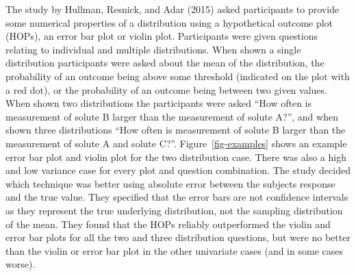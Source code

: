 \documentclass[
  letterpaper,
  DIV=11,
  numbers=noendperiod]{scrartcl}
\begin{document}
The study by Hullman, Resnick, and Adar (2015) asked participants to
provide some numerical properties of a distribution using a hypothetical
outcome plot (HOPs), an error bar plot or violin plot. Participants were
given questions relating to individual and multiple distributions. When
shown a single distribution participants were asked about the mean of
the distribution, the probability of an outcome being above some
threshold (indicated on the plot with a red dot), or the probability of
an outcome being between two given values. When shown two distributions
the participants were asked ``How often is measurement of solute B
larger than the measurement of solute A?'', and when shown three
distributions ``How often is measurement of solute B larger than the
measurement of solute A and solute C?''. Figure~\ref{fig-examples} shows
an example error bar plot and violin plot for the two distribution case.
There was also a high and low variance case for every plot and question
combination. The study decided which technique was better using absolute
error between the subjects response and the true value. They specified
that the error bars are not confidence intervals as they represent the
true underlying distribution, not the sampling distribution of the mean.
They found that the HOPs reliably outperformed the violin and error bar
plots for all the two and three distribution questions, but were no
better than the violin or error bar plot in the other univariate cases
(and in some cases worse).
\end{document}
